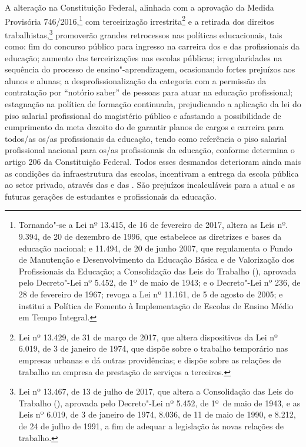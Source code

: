A alteração na Constituição Federal, alinhada com a aprovação da Medida
Provisória 746/2016,\footnote{Tornando"-se a Lei nº 13.415, de 16
  de fevereiro de 2017, altera as Leis nº. 9.394, de 20 de dezembro de
  1996, que estabelece as diretrizes e bases da educação nacional; e
  11.494, de 20 de junho 2007, que regulamenta o Fundo de Manutenção e
  Desenvolvimento da Educação Básica e de Valorização dos Profissionais
  da Educação; a Consolidação das Leis do Trabalho (), aprovada pelo
  Decreto"-Lei nº 5.452, de 1º de maio de 1943; e o Decreto"-Lei nº 236,
  de 28 de fevereiro de 1967; revoga a Lei nº 11.161, de 5 de agosto de
  2005; e institui a Política de Fomento à Implementação de Escolas de
  Ensino Médio em Tempo Integral.} com terceirização
irrestrita\footnote{Lei nº 13.429, de 31 de março de 2017, que
  altera dispositivos da Lei nº 6.019, de 3 de
  janeiro de 1974, que dispõe sobre o trabalho temporário nas empresas
  urbanas e dá outras providências; e dispõe sobre as relações de
  trabalho na empresa de prestação de serviços a terceiros.} e a
retirada dos direitos trabalhistas,\footnote{Lei nº 13.467, de 13
  de julho de 2017, que altera a Consolidação das Leis do Trabalho (),
  aprovada pelo Decreto"-Lei nº 5.452, de
  1º~de maio de 1943, e as Leis
  nº 6.019, de 3 de janeiro de 1974, 8.036, de
  11 de maio de 1990, e 8.212, de 24 de julho de 1991, a fim de adequar
  a legislação às novas relações de trabalho.} promoverão grandes
retrocessos nas políticas educacionais, tais como: fim do concurso
público para ingresso na carreira dos e das profissionais da educação;
aumento das terceirizações nas escolas públicas; irregularidades na
sequência do processo de ensino"-aprendizagem, ocasionando fortes
prejuízos aos alunos e alunas; a desprofissionalização da categoria com
a permissão da contratação por ``notório saber'' de pessoas para atuar
na educação profissional; estagnação na política de formação continuada,
prejudicando a aplicação da lei do piso salarial profissional do
magistério público e afastando a possibilidade de cumprimento da meta
dezoito do  de garantir planos de cargos e carreira para todos/as
os/as profissionais da educação, tendo como referência o piso salarial
profissional nacional para os/as profissionais da educação, conforme
determina o artigo 206 da Constituição Federal. Todos esses desmandos
deterioram ainda mais as condições da infraestrutura das escolas,
incentivam a entrega da escola pública ao setor privado, através das 
e das . São prejuízos incalculáveis para a atual e as futuras
gerações de estudantes e profissionais da educação.

